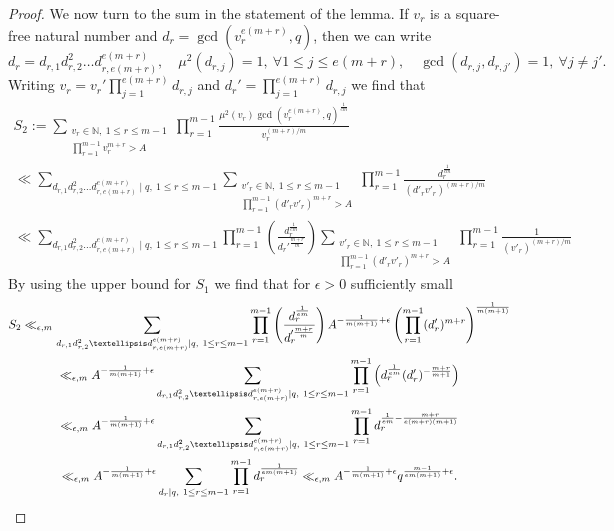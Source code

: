 \documentclass[10pt,a4paper]{amsart}
\begin{document}
\begin{proof}
We now turn to the sum in the statement of the lemma. If $v_r$ is a square-free natural number and $d_r=\gcd(v_r^{e(m+r)},q)$, then we can write 
$$d_r=d_{r,1}d_{r,2}^2\ldots d_{r,e(m+r)}^{e(m+r)},\quad \mu^2(d_{r,j})=1,\ \forall 1\leq j\leq e(m+r),\quad \gcd(d_{r,j},d_{r,j'})=1,\ \forall j\neq j'.$$
Writing $v_r=v_r'\prod_{j=1}^{e(m+r)}d_{r,j}$ and $d_r'=\prod_{j=1}^{e(m+r)}d_{r,j}$ we find that
\begin{gather*}
S_2:=\sum_{\substack{ v_{r}\in \mathbb{N},\ 1\leq r\leq m-1\\\prod_{r=1}^{m-1} v_{r}^{m+r}>A }} \prod_{r=1}^{m-1}\frac{\mu^2( v_{r})\gcd( v_{r}^{e(m+r)},q)^\frac 1{em}}{ v_{r}^{(m+r)/m}} \\
\ll \sum_{d_{r,1}d_{r,2}^2\ldots d_{r,e(m+r)}^{e(m+r)} \mid q,\ 1\leq r\leq m-1} \sum_{\substack{ v'_{r}\in \mathbb{N},\ 1\leq r\leq m-1\\\prod_{r=1}^{m-1} (d'_rv'_{r})^{m+r}>A }} \prod_{r=1}^{m-1}\frac{d_r^\frac 1{em}}{ (d'_rv'_{r})^{(m+r)/m}} \\
\ll \sum_{d_{r,1}d_{r,2}^2\ldots d_{r,e(m+r)}^{e(m+r)} \mid q,\ 1\leq r\leq m-1} \prod_{r=1}^{m-1} \left(\frac{d_r^{\frac{1}{em}}}{d_r'^{\frac{m+r}{m}}}\right) \sum_{\substack{ v'_{r}\in \mathbb{N},\ 1\leq r\leq m-1\\\prod_{r=1}^{m-1} (d'_rv'_{r})^{m+r}>A }} \prod_{r=1}^{m-1}\frac{1}{ (v'_{r})^{(m+r)/m}}
\end{gather*}
By using the upper bound for $S_1$ we find that for $\epsilon >0$ sufficiently small
\begin{gather*}
S_2 \ll_{\epsilon,m} \sum_{d_{r,1}d_{r,2}^2\ldots d_{r,e(m+r)}^{e(m+r)} \mid q,\ 1\leq r\leq m-1} \prod_{r=1}^{m-1} \left(\frac{d_r^{\frac{1}{em}}}{d_r'^{\frac{m+r}{m}}}\right) A^{-\frac{1}{m(m+1)}+\epsilon} \left(\prod_{r=1}^{m-1}(d_r')^{m+r}\right)^{\frac{1}{m(m+1)}} \\
\ll_{\epsilon,m} A^{-\frac{1}{m(m+1)}+\epsilon} \sum_{d_{r,1}d_{r,2}^2\ldots d_{r,e(m+r)}^{e(m+r)} \mid q,\ 1\leq r\leq m-1} \prod_{r=1}^{m-1} \left( d_r^{\frac{1}{em}} (d_r')^{-\frac{m+r}{m+1}}\right)\\
\ll_{\epsilon,m} A^{-\frac{1}{m(m+1)}+\epsilon} \sum_{d_{r,1}d_{r,2}^2\ldots d_{r,e(m+r)}^{e(m+r)} \mid q,\ 1\leq r\leq m-1} \prod_{r=1}^{m-1}  d_{r}^{\frac{1}{em}-\frac{m+r}{e(m+r)(m+1)}}\\
\ll_{\epsilon,m} A^{-\frac{1}{m(m+1)}+\epsilon} \sum_{d_r \mid q,\ 1\leq r\leq m-1} \prod_{r=1}^{m-1} d_{r}^{\frac{1}{em(m+1)}} \ll_{\epsilon,m} A^{-\frac{1}{m(m+1)}+\epsilon} q^{\frac{m-1}{em(m+1)}+\epsilon}.\qedhere
\end{gather*}


\end{proof}
\end{document}
